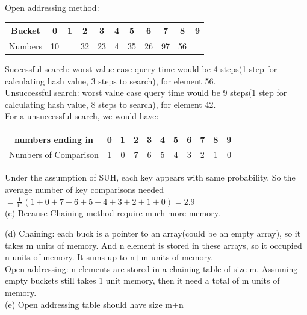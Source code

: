 \documentclass[12pt]{article}
\begin{document}
Open addressing method:\\
\begin{center}
 \begin{tabular}{||c c c c c c c c c c c||} 
 \hline
Bucket & 0 & 1 & 2 &3&4&5&6&7&8&9 \\ [0.5ex] 
 \hline\hline
 Numbers & 10 & &32 &23 &4 &35&26&97&56& \\ 
 \hline
\end{tabular}
\end{center}
Successful search: worst value case query time would be 4 steps(1 step for calculating hash value, 3 steps to search), for element 56.\\
Unsuccessful search: worst value case query time would be 9 steps(1 step for calculating hash value, 8 steps to search), for element 42.\\
For a unsuccessful search, we would have:
\begin{center}
 \begin{tabular}{||c c c c c c c c c c c||} 
 \hline
numbers ending in & 0 & 1 & 2 &3&4&5&6&7&8&9 \\ [0.5ex] 
 \hline\hline
 Numbers of Comparison & 1 & 0&7 &6 &5 &4&3&2&1&0 \\ 
 \hline
 \end{tabular}
\end{center}
Under the assumption of SUH, each key appears with same probability, So the average number of key comparisons needed $= \frac{1}{10}( 1 + 0+7 +6 +5 +4+3+2+1+0) = 2.9$\\

(c) Because Chaining method require much more memory.

(d) Chaining: each buck is a pointer to an array(could be an empty array), so it takes m units of memory. And n element is stored in these arrays, so it occupied n units of memory. It sums up to n+m units of memory.\\
Open addressing: n elements are stored in a chaining table of size m. Assuming empty buckets still takes 1 unit memory, then it need a total of m units of memory.\\

(e) Open addressing table should have size m+n
\end{document}
